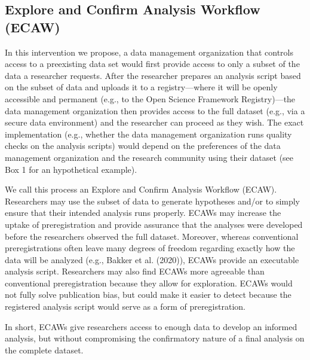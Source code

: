 \documentclass[
  man,floatsintext]{apa6}
\begin{document}
\hypertarget{explore-and-confirm-analysis-workflow-ecaw}{%
\subsection{Explore and Confirm Analysis Workflow (ECAW)}\label{explore-and-confirm-analysis-workflow-ecaw}}

In this intervention we propose, a data management organization that controls access to a preexisting data set would first provide access to only a subset of the data a researcher requests. After the researcher prepares an analysis script based on the subset of data and uploads it to a registry---where it will be openly accessible and permanent (e.g., to the Open Science Framework Registry)---the data management organization then provides access to the full dataset (e.g., via a secure data environment) and the researcher can proceed as they wish. The exact implementation (e.g., whether the data management organization runs quality checks on the analysis scripts) would depend on the preferences of the data management organization and the research community using their dataset (see Box 1 for an hypothetical example).

We call this process an Explore and Confirm Analysis Workflow (ECAW). Researchers may use the subset of data to generate hypotheses and/or to simply ensure that their intended analysis runs properly. ECAWs may increase the uptake of preregistration and provide assurance that the analyses were developed before the researchers observed the full dataset. Moreover, whereas conventional preregistrations often leave many degrees of freedom regarding exactly how the data will be analyzed (e.g., Bakker et al. (2020)), ECAWs provide an executable analysis script. Researchers may also find ECAWs more agreeable than conventional preregistration because they allow for exploration. ECAWs would not fully solve publication bias, but could make it easier to detect because the registered analysis script would serve as a form of preregistration.

In short, ECAWs give researchers access to enough data to develop an informed analysis, but without compromising the confirmatory nature of a final analysis on the complete dataset.
\end{document}
